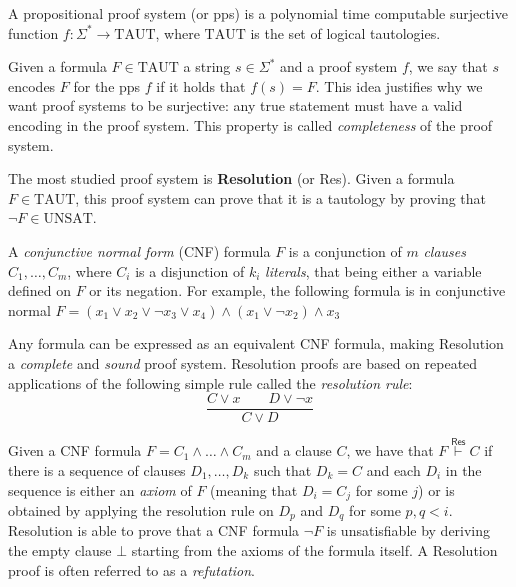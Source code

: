 \begin{definition}
 A propositional proof system (or pps) is a polynomial time computable surjective function $f : \Sigma^* \to \mathrm{TAUT}$, where $\mathrm{TAUT}$ is the set of logical tautologies.
\end{definition}

Given a formula $F \in \mathrm{TAUT}$ a string $s \in \Sigma^*$ and a proof system $f$, we say that $s$ encodes $F$ for the pps $f$ if it holds that $f(s) = F$. This idea justifies why we want proof systems to be surjective: any true statement must have a valid encoding in the proof system. This property is called \textit{completeness} of the proof system.

The most studied proof system is \textbf{Resolution} (or \textsf{Res}). Given a formula $F \in \mathrm{TAUT}$, this proof system can prove that it is a tautology by proving that $\lnot F \in \mathrm{UNSAT}$.

A \textit{conjunctive normal form} (CNF) formula $F$ is a conjunction of $m$ \textit{clauses} $C_1, \ldots, C_m$, where $C_i$ is a disjunction of $k_i$ \textit{literals}, that being either a variable defined on $F$ or its negation. For example, the following formula is in conjunctive normal $F = (x_1 \lor x_2 \lor \lnot{x_3} \lor x_4) \land (x_1 \lor \lnot{x_2}) \land x_3$

Any formula can be expressed as an equivalent CNF formula, making Resolution a \textit{complete} and \textit{sound} proof system. Resolution proofs are based on repeated applications of the following simple rule called the \textit{resolution rule}:
\[\dfrac{C \lor x \qquad D \lor \lnot x}{C \lor D}\]

Given a CNF formula $F = C_1 \land \ldots \land C_m$ and a clause $C$, we have that $F \stackrel{\mathsf{Res}}{\vdash} C$ if there is a sequence of clauses $D_1, \ldots, D_k$ such that $D_k = C$ and each $D_i$ in the sequence is either an \textit{axiom} of $F$ (meaning that $D_i = C_j$ for some $j$) or is obtained by applying the resolution rule on $D_p$ and $D_q$ for some $p,q < i$. Resolution is able to prove that a CNF formula $\lnot F$ is unsatisfiable by deriving the empty clause $\bot$ starting from the axioms of the formula itself. A Resolution proof is often referred to as a \textit{refutation}.

